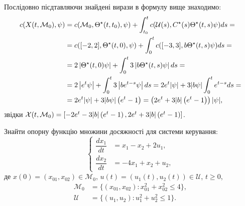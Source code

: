 \begin{solution}
    Послідовно пісдтавляючи знайдені вирази в формулу вище знаходимо:
    \begin{equation*}
    \begin{split}
        c(X(t, \mathcal{M}_0), \psi) &= c(\mathcal{M}_0, \Theta^\star(t, t_0), \psi) + \int_{t_0}^t c(\mathcal{U}(s), C^\star(s) \Theta^\star(t, s)\psi) ds = \\
        &= c([-2,2], \Theta^\star(t, 0), \psi) + \int_0^t c([-3, 3], b \Theta^\star(t, s)\psi) ds = \\
        &= 2\left|\Theta^\star(t, 0)\psi\right| + \int_0^t 3\left|b \Theta^\star(t, s)\psi\right| ds = \\
        &= 2\left|e^t\psi\right| + \int_0^t 3\left|b e^{t-s}\psi\right| ds = 2e^t|\psi| + 3|b \psi| \int_0^t e^{t-s} ds = \\
        &= 2e^t|\psi| + 3|b \psi| \left(e^t - 1\right) = \left(2e^t + 3|b|\left(e^t - 1\right)\right) |\psi|,
    \end{split}
    \end{equation*}
    звідки $\mathcal{X}(t, \mathcal{M}_0) = \left[-2e^t - 3|b|\left(e^t - 1\right), 2e^t + 3|b|\left(e^t - 1\right)\right]$.
\end{solution}

\begin{problem}
Знайти опорну функцію множини досяжності для системи керування:
\begin{equation*}
    \left\{
    \begin{aligned}
    \dfrac{dx_1}{dt} &= x_1 - x_2 + 2u_1, \\
    \dfrac{dx_2}{dt} &= -4x_1 + x_2 + u_2,
    \end{aligned}
    \right.
\end{equation*}
де $x(0) = (x_{01}, x_{02}) \in \mathcal{M}_0$, $u(t) = (u_1(t), u_2(t)) \in\mathcal{U}$, $t\ge0$,
\begin{align*}
    \mathcal{M}_0 &= \{(x_{01},x_{02}): x_{01}^2 + x_{02}^2 \le 4\}, \\
    \mathcal{U} &= \{(u_1, u_2): u_1^2 + u_2^2 \le 1\}.
\end{align*}
\end{problem}

